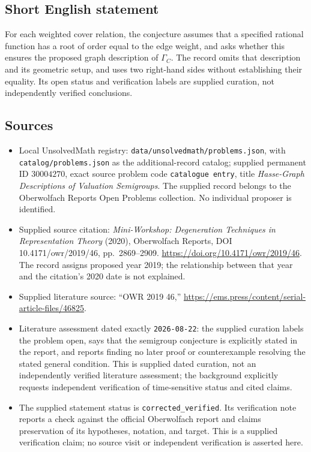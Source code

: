 \documentclass[11pt]{article}
\begin{document}
\subsection{Short English statement}
For each weighted cover relation, the conjecture assumes that a specified rational function has a root of order equal to the edge weight, and asks whether this ensures the proposed graph description of \(\Gamma_C\). The record omits that description and its geometric setup, and uses two right-hand sides without establishing their equality. Its open status and verification labels are supplied curation, not independently verified conclusions.
\subsection{Sources}
\begin{itemize}
\item Local UnsolvedMath registry: \texttt{data/unsolvedmath/problems.json}, with \texttt{catalog/problems.json} as the additional-record catalog; supplied permanent ID \(30004270\), exact source problem code \texttt{catalogue entry}, title \emph{Hasse-Graph Descriptions of Valuation Semigroups}. The supplied record belongs to the Oberwolfach Reports Open Problems collection. No individual proposer is identified.
\item Supplied source citation: \emph{Mini-Workshop: Degeneration Techniques in Representation Theory} (2020), Oberwolfach Reports, DOI 10.4171/owr/2019/46, pp.\ 2869--2909. \url{https://doi.org/10.4171/owr/2019/46}. The record assigns proposed year 2019; the relationship between that year and the citation's 2020 date is not explained.
\item Supplied literature source: ``OWR 2019 46,'' \url{https://ems.press/content/serial-article-files/46825}.
\item Literature assessment dated exactly \texttt{2026-08-22}: the supplied curation labels the problem open, says that the semigroup conjecture is explicitly stated in the report, and reports finding no later proof or counterexample resolving the stated general condition. This is supplied dated curation, not an independently verified literature assessment; the background explicitly requests independent verification of time-sensitive status and cited claims.
\item The supplied statement status is \texttt{corrected\_verified}. Its verification note reports a check against the official Oberwolfach report and claims preservation of its hypotheses, notation, and target. This is a supplied verification claim; no source visit or independent verification is asserted here.
\end{itemize}
\end{document}

